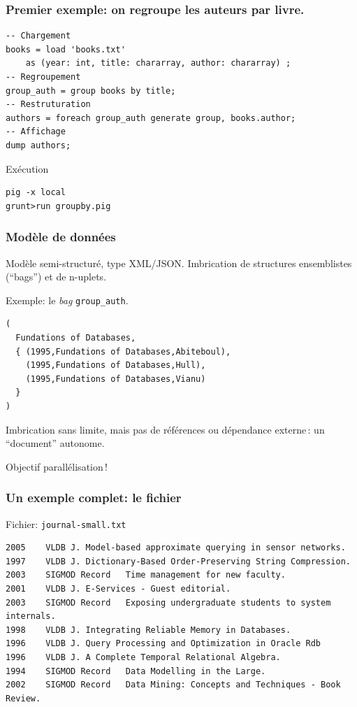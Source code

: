 \begin{frame}[fragile]
\frametitle{Premier exemple: on regroupe les auteurs par livre.}



\begin{verbatim}
-- Chargement
books = load 'books.txt' 
    as (year: int, title: chararray, author: chararray) ;
-- Regroupement    
group_auth = group books by title;
-- Restruturation
authors = foreach group_auth generate group, books.author;
-- Affichage
dump authors;
\end{verbatim}

\begin{defblock}{Exécution}
\begin{verbatim}
pig -x local
grunt>run groupby.pig
\end{verbatim}
\end{defblock}

\end{frame}

\begin{frame}[fragile]
\frametitle{Modèle de données}

Modèle semi-structuré, type XML/JSON. Imbrication de structures ensemblistes (``bags'') et de n-uplets.

\vfill

Exemple: le \textit{bag} \texttt{group\_auth}.

\small{
\begin{verbatim}
(
  Fundations of Databases,
  { (1995,Fundations of Databases,Abiteboul),
    (1995,Fundations of Databases,Hull),
    (1995,Fundations of Databases,Vianu)
  }
)
\end{verbatim}
}

Imbrication sans limite, mais pas de références ou dépendance externe\,: un ``document'' autonome. 


\vfill

\alert{Objectif parallélisation}\,!
\end{frame}


\begin{frame}[fragile]
\frametitle{Un exemple complet: le fichier}

Fichier: \texttt{journal-small.txt}
\footnotesize\begin{verbatim}
2005    VLDB J. Model-based approximate querying in sensor networks.
1997    VLDB J. Dictionary-Based Order-Preserving String Compression.
2003	SIGMOD Record	Time management for new faculty.
2001    VLDB J. E-Services - Guest editorial.
2003	SIGMOD Record	Exposing undergraduate students to system internals.
1998    VLDB J. Integrating Reliable Memory in Databases.
1996    VLDB J. Query Processing and Optimization in Oracle Rdb
1996    VLDB J. A Complete Temporal Relational Algebra.
1994	SIGMOD Record	Data Modelling in the Large.
2002	SIGMOD Record	Data Mining: Concepts and Techniques - Book Review.
\end{verbatim}

\end{frame}


